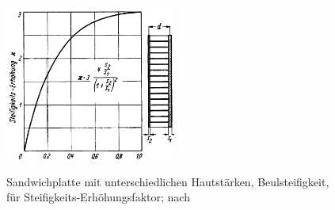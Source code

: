 \begin{figure}[h]
	\centering
	\includegraphics[width=0.5\textwidth]{Bilder/Hertel Sandwich.png}
	\label{fig: Hertel_Sandwich}
	\caption{Sandwichplatte mit unterschiedlichen Hautstärken, Beulsteifigkeit, für Steifigkeits-Erhöhungsfaktor; nach \cite{item1}}
\end{figure}
\FloatBarrier
\newpage
